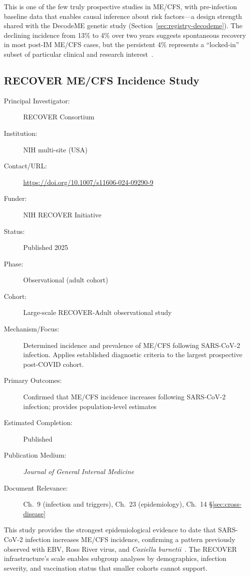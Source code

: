 This is one of the few truly prospective studies in ME/CFS, with pre-infection
baseline data that enables causal inference about risk factors---a design
strength shared with the DecodeME genetic study
(Section~\ref{sec:registry-decodeme}).  The declining incidence from 13\% to
4\% over two years suggests spontaneous recovery in most post-IM ME/CFS
cases, but the persistent 4\% represents a ``locked-in'' subset of
particular clinical and research interest~\cite{Katz2026mononucleosis7yr}.

\subsection{RECOVER ME/CFS Incidence Study}
\label{sec:registry-recover-incidence}

\begin{description}
    \item[Principal Investigator:] RECOVER Consortium
    \item[Institution:] NIH multi-site (USA)
    \item[Contact/URL:] \url{https://doi.org/10.1007/s11606-024-09290-9}
    \item[Funder:] NIH RECOVER Initiative
    \item[Status:] Published 2025
    \item[Phase:] Observational (adult cohort)
    \item[Cohort:] Large-scale RECOVER-Adult observational study
    \item[Mechanism/Focus:] Determined incidence and prevalence of ME/CFS
        following SARS-CoV-2 infection.  Applies established diagnostic
        criteria to the largest prospective post-COVID cohort.
    \item[Primary Outcomes:] Confirmed that ME/CFS incidence increases
        following SARS-CoV-2 infection; provides population-level estimates
    \item[Estimated Completion:] Published
    \item[Publication Medium:] \textit{Journal of General Internal Medicine}
    \item[Document Relevance:] Ch.~9 (infection and triggers), Ch.~23
        (epidemiology), Ch.~14 \S\ref{sec:cross-disease}
\end{description}

This study provides the strongest epidemiological evidence to date that
SARS-CoV-2 infection increases ME/CFS incidence, confirming a pattern
previously observed with EBV, Ross River virus, and \textit{Coxiella
burnetii}~\cite{RECOVER2025}.  The RECOVER infrastructure's
scale enables subgroup analyses by demographics, infection severity, and
vaccination status that smaller cohorts cannot support.

